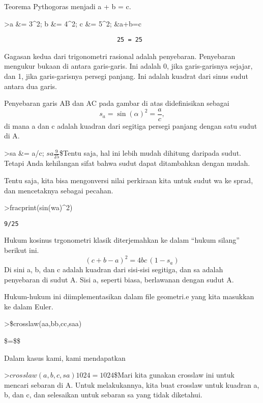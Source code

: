 \documentclass[
]{book}
\begin{document}
Teorema Pythogoras menjadi a + b = c.

\textgreater a \&= 3\^{}2; b \&= 4\^{}2; c \&= 5\^{}2; \&a+b=c

\begin{verbatim}
                               25 = 25
\end{verbatim}

Gagasan kedua dari trigonometri rasional adalah penyebaran. Penyebaran mengukur bukaan di antara garis-garis. Ini adalah 0, jika garis-garisnya sejajar, dan 1, jika garis-garisnya persegi panjang. Ini adalah kuadrat dari sinus sudut antara dua garis.

Penyebaran garis AB dan AC pada gambar di atas didefinisikan sebagai \[s_a = \sin(\alpha)^2 = \frac{a}{c},\]di mana a dan c adalah kuadran dari segitiga persegi panjang dengan satu sudut di A.

\textgreater sa \&= a/c; \(sa\)\(\frac{9}{25}\)\$Tentu saja, hal ini lebih mudah dihitung daripada sudut. Tetapi Anda kehilangan sifat bahwa sudut dapat ditambahkan dengan mudah.

Tentu saja, kita bisa mengonversi nilai perkiraan kita untuk sudut wa ke sprad, dan mencetaknya sebagai pecahan.

\textgreater fracprint(sin(wa)\^{}2)

\begin{verbatim}
9/25
\end{verbatim}

Hukum kosinus trgonometri klasik diterjemahkan ke dalam ``hukum silang'' berikut ini. \[(c+b-a)^2 = 4 b c \, (1-s_a)\]Di sini a, b, dan c adalah kuadran dari sisi-sisi segitiga, dan sa adalah penyebaran di sudut A. Sisi a, seperti biasa, berlawanan dengan sudut A.

Hukum-hukum ini diimplementasikan dalam file geometri.e yang kita masukkan ke dalam Euler.

\textgreater\$crosslaw(aa,bb,cc,saa)

\$ = \$\$

Dalam kasus kami, kami mendapatkan

\textgreater{}\(crosslaw(a,b,c,sa)\)\(1024=1024\)\$Mari kita gunakan crosslaw ini untuk mencari sebaran di A. Untuk melakukannya, kita buat crosslaw untuk kuadran a, b, dan c, dan selesaikan untuk sebaran sa yang tidak diketahui.
\end{document}
